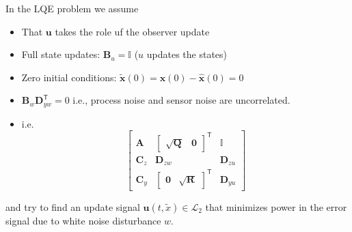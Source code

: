 In the LQE problem we assume
\begin{itemize}
    \item That $\mathbf{u}$ takes the role uf the observer update
    \item Full state updates: $\mathbf{B}_u=\mathbf{\mathbb{I}}$ ($u$ updates the states)
    \item Zero initial conditions: $\tilde{\mathbf{x}}(0)=\mathbf{x}(0)-\hat{\mathbf{x}}(0)=0$
    \item $\mathbf{B}_w \mathbf{D}_{yw}^{\mathsf{T}}=0$ i.e., process noise and sensor noise are uncorrelated.
    \item i.e.
          \noindent\begin{equation*}
              \begin{bmatrix}
                  \mathbf{A}   & \begin{bmatrix} \sqrt{\mathbf{Q}} & \mathbf{0} \end{bmatrix}^{\mathsf{T}} & \mathbb{I}      \\
                  \mathbf{C}_z & \mathbf{D}_{zw}                                                                       & \mathbf{D}_{zu} \\
                  \mathbf{C}_y & \begin{bmatrix}\mathbf{0} &  \sqrt{\mathbf{R}}\end{bmatrix}^{\mathsf{T}}  & \mathbf{D}_{yu}
              \end{bmatrix}
          \end{equation*}
\end{itemize}
and try to find an update signal $\mathbf{u}(t,\tilde{x})\in \mathcal{L}_2$ that minimizes power in the error signal due to white noise disturbance $w$.

\newpar{}

